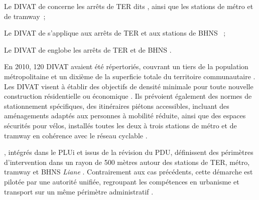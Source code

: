 \begin{refsegment}
{\begin{customitemize}
    \item Le \acrshort{DIVAT} de  concerne les arrêts de \acrshort{TER} dits , ainsi que les stations de métro et de tramway~;
    \item Le \acrshort{DIVAT} de  s’applique aux arrêts de \acrshort{TER}  et aux stations de \acrshort{BHNS} ~;
    \item Le \acrshort{DIVAT} de  englobe les arrêts de \acrshort{TER} et de \acrshort{BHNS} .
        \end{customitemize}
    En 2010, 120 \acrshort{DIVAT} avaient été répertoriés, couvrant un tiers de la population métropolitaine et un dixième de la superficie totale du territoire communautaire \textcolor{blue}{\autocite[18]{cerema_articuler_2010}}. Les \acrshort{DIVAT} visent à établir des objectifs de densité minimale pour toute nouvelle construction résidentielle ou économique \textcolor{blue}{\autocite[19]{lmcu_plan_2011}}. Ils prévoient également des normes de stationnement spécifiques, des itinéraires piétons accessibles, incluant des aménagements adaptés aux personnes à mobilité réduite, ainsi que des espaces sécurités pour vélos, installés toutes les deux à trois stations de métro et de tramway en cohérence avec le réseau cyclable \textcolor{blue}{\autocite[19]{lmcu_plan_2011}}.
}, intégrés dans le \acrfull{PLUi} et issus de la révision du \acrshort{PDU}, définissent des périmètres d’intervention dans un rayon de 500 mètres autour des stations de \acrshort{TER}, métro, tramway et \acrshort{BHNS} \textsl{Liane} \textcolor{blue}{\autocites[19]{lmcu_plan_2011}[26]{meunier-chabert_contrats_2014}}. Contrairement aux cas précédents, cette démarche est pilotée par une autorité unifiée, regroupant les compétences en urbanisme et transport sur un même périmètre administratif \textcolor{blue}{\autocite[3]{cerema_articuler_2010}}.%


\end{refsegment}
